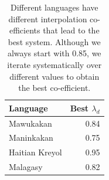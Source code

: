 \documentclass[11pt]{article}
\begin{document}
	\begin{table}
        \centering
		{
		\begin{tabular}{lr}
		\hline
		Language & Best $\lambda_{d}$ \\
		\hline
		Mawukakan & 0.84 \\
		Maninkakan & 0.75 \\
		Haitian Kreyol & 0.95 \\
		Malagasy & 0.82 \\
		\hline
		\end{tabular}
        }
		\caption{Different languages have different interpolation co-efficients that lead to the best system. Although we always start with 0.85, we iterate systematically over different values to obtain the best co-efficient.}
		\label{table:condor_run}
	\end{table}

\end{document}
